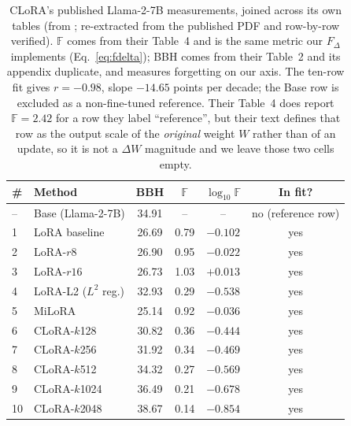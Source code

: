 \documentclass[11pt]{article}
\newcommand{\dw}{F_{\Delta}}
\begin{document}
\begin{table}[t]
  \centering
  \begin{tabular}{llcccc}
    \toprule
    \# & Method & BBH & $\mathbb{F}$ & $\log_{10}\mathbb{F}$ & In fit? \\
    \midrule
    -- & Base (Llama-2-7B) & 34.91 & -- & -- & no (reference row) \\
    \midrule
    1  & LoRA baseline     & 26.69 & 0.79 & $-0.102$ & yes \\
    2  & LoRA-$r8$         & 26.90 & 0.95 & $-0.022$ & yes \\
    3  & LoRA-$r16$        & 26.73 & 1.03 & $+0.013$ & yes \\
    4  & LoRA-L2 ($L^2$ reg.) & 32.93 & 0.29 & $-0.538$ & yes \\
    5  & MiLoRA            & 25.14 & 0.92 & $-0.036$ & yes \\
    6  & CLoRA-$k$128      & 30.82 & 0.36 & $-0.444$ & yes \\
    7  & CLoRA-$k$256      & 31.92 & 0.34 & $-0.469$ & yes \\
    8  & CLoRA-$k$512      & 34.32 & 0.27 & $-0.569$ & yes \\
    9  & CLoRA-$k$1024     & 36.49 & 0.21 & $-0.678$ & yes \\
    10 & CLoRA-$k$2048     & 38.67 & 0.14 & $-0.854$ & yes \\
    \bottomrule
  \end{tabular}
  \caption{CLoRA's published Llama-2-7B measurements, joined across its own
  tables (from \citealp{clora}; re-extracted from the published PDF and
  row-by-row verified). $\mathbb{F}$ comes from their Table~4 and is the same
  metric our $\dw$ implements (Eq.~\ref{eq:fdelta}); BBH comes from their
  Table~2 and its appendix duplicate, and measures forgetting on our axis. The
  ten-row fit gives $r = -0.98$, slope $-14.65$
  points per decade; the Base row is excluded as a non-fine-tuned reference.
  Their Table~4 does report $\mathbb{F}\!=\!2.42$ for a row they label
  ``reference'', but their text defines that row as the output scale of the
  \emph{original} weight $W$ rather than of an update, so it is not a
  $\Delta W$ magnitude and we leave those two cells empty.}
  \label{tab:clora}
\end{table}

\end{document}
